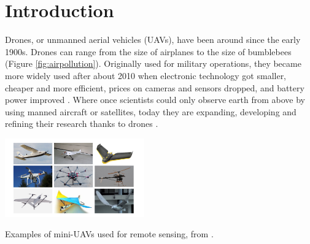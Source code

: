 \chapter*{Introduction}







Drones, or unmanned aerial vehicles (UAVs), have been around since the early 1900s. Drones can range from the size of airplanes to the size of bumblebees (Figure \ref{fig:airpollution}). Originally used for military operations, they became more widely used after about 2010 when electronic technology got smaller, cheaper and more efficient, prices on cameras and sensors dropped, and battery power improved \cite{xiang_xia_zhang_2020}\cite{overview_uavsensors}. Where once scientists could only observe earth from above by using manned aircraft or satellites, today they are expanding, developing and refining their research thanks to drones \cite{sørensen_jacobsen_hansen_2017} \cite{metrology_survey}\cite{xiang_xia_zhang_2020}.

\begin{marginfigure}%
      \includegraphics[width=6cm, center]{images/intro/mini_uavs.png}
      \caption{Examples of mini-UAVs used for remote sensing, from \cite{xiang_xia_zhang_2020}.} 
      \label{fig:mini_uavs}
\end{marginfigure}


